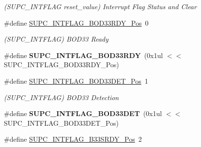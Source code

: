 \begin{DoxyCompactItemize}
\begin{DoxyCompactList}\small\item\em (S\+U\+P\+C\+\_\+\+I\+N\+T\+F\+L\+A\+G reset\+\_\+value) Interrupt Flag Status and Clear \end{DoxyCompactList}\item 
\hypertarget{group___s_a_m_l21___s_u_p_c_gaf80966801c44d7af52664d4a6f42cb3d}{}\#define \hyperlink{group___s_a_m_l21___s_u_p_c_gaf80966801c44d7af52664d4a6f42cb3d}{S\+U\+P\+C\+\_\+\+I\+N\+T\+F\+L\+A\+G\+\_\+\+B\+O\+D33\+R\+D\+Y\+\_\+\+Pos}~0\label{group___s_a_m_l21___s_u_p_c_gaf80966801c44d7af52664d4a6f42cb3d}

\begin{DoxyCompactList}\small\item\em (S\+U\+P\+C\+\_\+\+I\+N\+T\+F\+L\+A\+G) B\+O\+D33 Ready \end{DoxyCompactList}\item 
\hypertarget{group___s_a_m_l21___s_u_p_c_ga7cf2f913df94b7cf9c193503922bf268}{}\#define {\bfseries S\+U\+P\+C\+\_\+\+I\+N\+T\+F\+L\+A\+G\+\_\+\+B\+O\+D33\+R\+D\+Y}~(0x1ul $<$$<$ S\+U\+P\+C\+\_\+\+I\+N\+T\+F\+L\+A\+G\+\_\+\+B\+O\+D33\+R\+D\+Y\+\_\+\+Pos)\label{group___s_a_m_l21___s_u_p_c_ga7cf2f913df94b7cf9c193503922bf268}

\item 
\hypertarget{group___s_a_m_l21___s_u_p_c_gad6a0ea7c9faa1134b7acb761f8ce7f70}{}\#define \hyperlink{group___s_a_m_l21___s_u_p_c_gad6a0ea7c9faa1134b7acb761f8ce7f70}{S\+U\+P\+C\+\_\+\+I\+N\+T\+F\+L\+A\+G\+\_\+\+B\+O\+D33\+D\+E\+T\+\_\+\+Pos}~1\label{group___s_a_m_l21___s_u_p_c_gad6a0ea7c9faa1134b7acb761f8ce7f70}

\begin{DoxyCompactList}\small\item\em (S\+U\+P\+C\+\_\+\+I\+N\+T\+F\+L\+A\+G) B\+O\+D33 Detection \end{DoxyCompactList}\item 
\hypertarget{group___s_a_m_l21___s_u_p_c_ga2d25686a47446eb2335de6b412d02222}{}\#define {\bfseries S\+U\+P\+C\+\_\+\+I\+N\+T\+F\+L\+A\+G\+\_\+\+B\+O\+D33\+D\+E\+T}~(0x1ul $<$$<$ S\+U\+P\+C\+\_\+\+I\+N\+T\+F\+L\+A\+G\+\_\+\+B\+O\+D33\+D\+E\+T\+\_\+\+Pos)\label{group___s_a_m_l21___s_u_p_c_ga2d25686a47446eb2335de6b412d02222}

\item 
\hypertarget{group___s_a_m_l21___s_u_p_c_ga9ba8d2269aee5eaf5767eafc21a25a45}{}\#define \hyperlink{group___s_a_m_l21___s_u_p_c_ga9ba8d2269aee5eaf5767eafc21a25a45}{S\+U\+P\+C\+\_\+\+I\+N\+T\+F\+L\+A\+G\+\_\+\+B33\+S\+R\+D\+Y\+\_\+\+Pos}~2\label{group___s_a_m_l21___s_u_p_c_ga9ba8d2269aee5eaf5767eafc21a25a45}


\end{DoxyCompactItemize}
